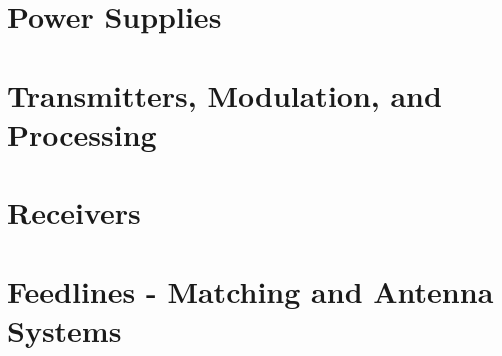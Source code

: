 \documentclass[letterpaper]{article}
\begin{document}
        \newpage

        \section{Power Supplies}

    \newpage

    \section{Transmitters, Modulation, and Processing}

    \newpage

    \section{Receivers}

    \newpage

    \section{Feedlines - Matching and Antenna Systems}
\end{document}

